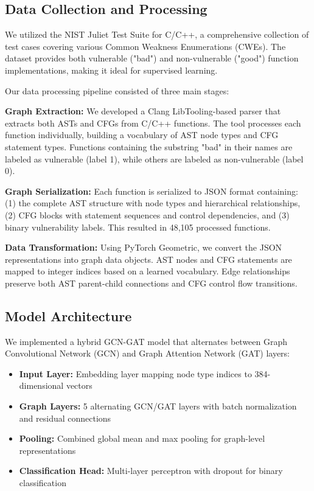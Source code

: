 \subsection{Data Collection and Processing}

We utilized the NIST Juliet Test Suite for C/C++, a comprehensive collection of test cases covering various Common Weakness Enumerations (CWEs). The dataset provides both vulnerable ("bad") and non-vulnerable ("good") function implementations, making it ideal for supervised learning.

Our data processing pipeline consisted of three main stages:

\textbf{Graph Extraction:} We developed a Clang LibTooling-based parser that extracts both ASTs and CFGs from C/C++ functions. The tool processes each function individually, building a vocabulary of AST node types and CFG statement types. Functions containing the substring "bad" in their names are labeled as vulnerable (label 1), while others are labeled as non-vulnerable (label 0).

\textbf{Graph Serialization:} Each function is serialized to JSON format containing: (1) the complete AST structure with node types and hierarchical relationships, (2) CFG blocks with statement sequences and control dependencies, and (3) binary vulnerability labels. This resulted in 48,105 processed functions.

\textbf{Data Transformation:} Using PyTorch Geometric, we convert the JSON representations into graph data objects. AST nodes and CFG statements are mapped to integer indices based on a learned vocabulary. Edge relationships preserve both AST parent-child connections and CFG control flow transitions.

\subsection{Model Architecture}

We implemented a hybrid GCN-GAT model that alternates between Graph Convolutional Network (GCN) and Graph Attention Network (GAT) layers:

\begin{itemize}
\item \textbf{Input Layer:} Embedding layer mapping node type indices to 384-dimensional vectors
\item \textbf{Graph Layers:} 5 alternating GCN/GAT layers with batch normalization and residual connections
\item \textbf{Pooling:} Combined global mean and max pooling for graph-level representations  
\item \textbf{Classification Head:} Multi-layer perceptron with dropout for binary classification
\end{itemize}

